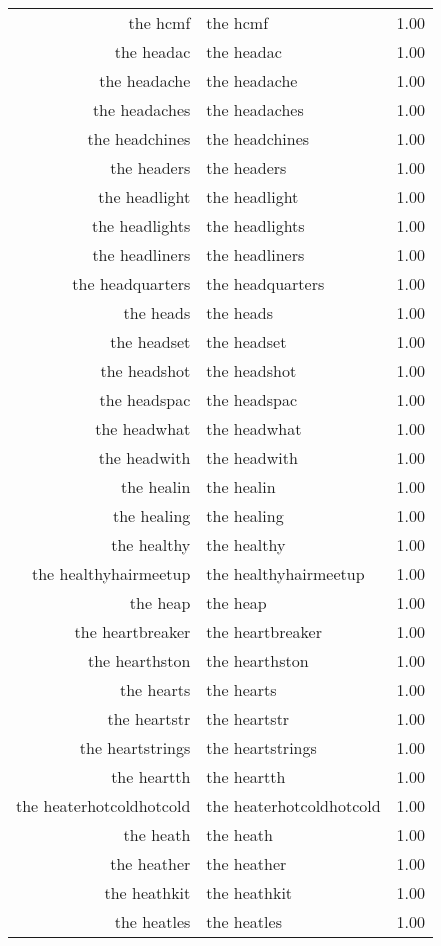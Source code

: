 \begin{table}[ht]
\begin{tabular}{rlr}
  the hcmf & the hcmf & 1.00 \\ 
  the headac & the headac & 1.00 \\ 
  the headache & the headache & 1.00 \\ 
  the headaches & the headaches & 1.00 \\ 
  the headchines & the headchines & 1.00 \\ 
  the headers & the headers & 1.00 \\ 
  the headlight & the headlight & 1.00 \\ 
  the headlights & the headlights & 1.00 \\ 
  the headliners & the headliners & 1.00 \\ 
  the headquarters & the headquarters & 1.00 \\ 
  the heads & the heads & 1.00 \\ 
  the headset & the headset & 1.00 \\ 
  the headshot & the headshot & 1.00 \\ 
  the headspac & the headspac & 1.00 \\ 
  the headwhat & the headwhat & 1.00 \\ 
  the headwith & the headwith & 1.00 \\ 
  the healin & the healin & 1.00 \\ 
  the healing & the healing & 1.00 \\ 
  the healthy & the healthy & 1.00 \\ 
  the healthyhairmeetup & the healthyhairmeetup & 1.00 \\ 
  the heap & the heap & 1.00 \\ 
  the heartbreaker & the heartbreaker & 1.00 \\ 
  the hearthston & the hearthston & 1.00 \\ 
  the hearts & the hearts & 1.00 \\ 
  the heartstr & the heartstr & 1.00 \\ 
  the heartstrings & the heartstrings & 1.00 \\ 
  the heartth & the heartth & 1.00 \\ 
  the heaterhotcoldhotcold & the heaterhotcoldhotcold & 1.00 \\ 
  the heath & the heath & 1.00 \\ 
  the heather & the heather & 1.00 \\ 
  the heathkit & the heathkit & 1.00 \\ 
  the heatles & the heatles & 1.00 \\ 

\end{tabular}
\end{table}
